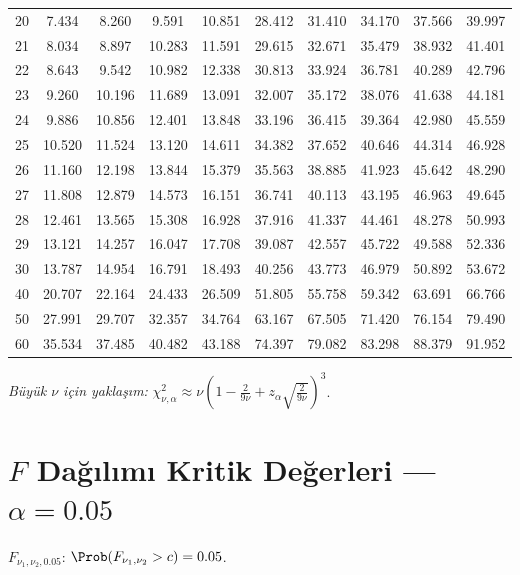 \begin{center}
\begin{tabular}{r|ccccccccc}
20 & 7.434 & 8.260 & 9.591 & 10.851 & 28.412 & 31.410 & 34.170 & 37.566 & 39.997 \\
21 & 8.034 & 8.897 & 10.283 & 11.591 & 29.615 & 32.671 & 35.479 & 38.932 & 41.401 \\
22 & 8.643 & 9.542 & 10.982 & 12.338 & 30.813 & 33.924 & 36.781 & 40.289 & 42.796 \\
23 & 9.260 & 10.196 & 11.689 & 13.091 & 32.007 & 35.172 & 38.076 & 41.638 & 44.181 \\
24 & 9.886 & 10.856 & 12.401 & 13.848 & 33.196 & 36.415 & 39.364 & 42.980 & 45.559 \\
25 & 10.520 & 11.524 & 13.120 & 14.611 & 34.382 & 37.652 & 40.646 & 44.314 & 46.928 \\
26 & 11.160 & 12.198 & 13.844 & 15.379 & 35.563 & 38.885 & 41.923 & 45.642 & 48.290 \\
27 & 11.808 & 12.879 & 14.573 & 16.151 & 36.741 & 40.113 & 43.195 & 46.963 & 49.645 \\
28 & 12.461 & 13.565 & 15.308 & 16.928 & 37.916 & 41.337 & 44.461 & 48.278 & 50.993 \\
29 & 13.121 & 14.257 & 16.047 & 17.708 & 39.087 & 42.557 & 45.722 & 49.588 & 52.336 \\
30 & 13.787 & 14.954 & 16.791 & 18.493 & 40.256 & 43.773 & 46.979 & 50.892 & 53.672 \\
40 & 20.707 & 22.164 & 24.433 & 26.509 & 51.805 & 55.758 & 59.342 & 63.691 & 66.766 \\
50 & 27.991 & 29.707 & 32.357 & 34.764 & 63.167 & 67.505 & 71.420 & 76.154 & 79.490 \\
60 & 35.534 & 37.485 & 40.482 & 43.188 & 74.397 & 79.082 & 83.298 & 88.379 & 91.952 \\
\hline
\end{tabular}
\end{center}

\noindent\textit{Büyük $\nu$ için yaklaşım:} $\chi^2_{\nu,\alpha}\approx\nu\!\left(1-\tfrac{2}{9\nu}+z_\alpha\sqrt{\tfrac{2}{9\nu}}\right)^3$.

\section{$F$ Dağılımı Kritik Değerleri — $\alpha=0.05$}
\label{app:f_tablo_05}

$F_{\nu_1,\nu_2,0.05}$: $\Prob(F_{\nu_1,\nu_2} > c) = 0.05$.

